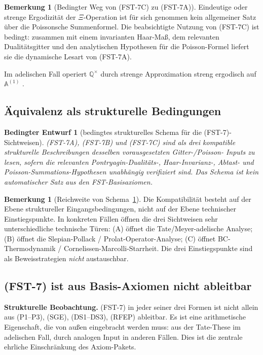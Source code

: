 \documentclass[11pt,a4paper]{article}
\theoremstyle{plain}
\newtheorem{blueprint}[theorem]{Bedingter Entwurf}
\theoremstyle{definition}
\newtheorem{remark}[theorem]{Bemerkung}
\newcommand{\Q}{\mathbb{Q}}
\newcommand{\A}{\mathbb{A}}
\begin{document}
\begin{remark}[Bedingter Weg von (FST-7C) zu (FST-7A)]
\label{prop:C-implies-A}
Eindeutige oder strenge Ergodizität der $\Xi$-Operation ist für sich
genommen kein allgemeiner Satz über die Poissonsche Summenformel. Die
beabsichtigte Nutzung von (FST-7C) ist bedingt: zusammen mit einem
invarianten Haar-Maß, dem relevanten Dualitätsgitter und den analytischen
Hypothesen für die Poisson-Formel liefert sie die dynamische Lesart von
(FST-7A).
\end{remark}

Im adelischen Fall operiert $\Q^\times$ durch strenge Approximation streng ergodisch auf
$\A^{(1)}$ \cite{CasselsFrohlich}.

\subsection{Äquivalenz als strukturelle Bedingungen}

\begin{blueprint}[bedingtes strukturelles Schema für die (FST-7)-Sichtweisen]
\label{thm:fst7-equiv}
(FST-7A), (FST-7B) und (FST-7C) sind als drei kompatible
strukturelle Beschreibungen desselben vorausgesetzten Gitter-/Poisson-
Inputs zu lesen, sofern die relevanten Pontryagin-Dualitäts-,
Haar-Invarianz-, Abtast- und Poisson-Summations-Hypothesen unabhängig
verifiziert sind. Das Schema ist kein automatischer Satz aus den
FST-Basisaxiomen.
\end{blueprint}

\begin{remark}[Reichweite von Schema~\ref{thm:fst7-equiv}]
Die Kompatibilität besteht auf der Ebene struktureller Eingangsbedingungen, nicht
auf der Ebene technischer Einstiegspunkte. In konkreten Fällen öffnen die drei
Sichtweisen sehr unterschiedliche technische Türen: (A) öffnet die Tate/Meyer-adelische Analyse;
(B) öffnet die Slepian-Pollack / Prolat-Operator-Analyse;
(C) öffnet BC-Thermodynamik / Cornelissen-Marcolli-Starrheit.
Die drei Einstiegspunkte sind als Beweisstrategien \emph{nicht} austauschbar.
\end{remark}

\subsection{(FST-7) ist aus Basis-Axiomen nicht ableitbar}

\textbf{Strukturelle Beobachtung.} (FST-7) in jeder seiner drei
Formen ist nicht allein aus (P1--P3), (SGE), (DS1--DS3), (RFEP) ableitbar.
Es ist eine arithmetische Eigenschaft, die von außen eingebracht werden muss:
aus der Tate-These im adelischen Fall, durch analogen Input in anderen Fällen.
Dies ist die zentrale ehrliche Einschränkung des Axiom-Pakets.
\end{document}
